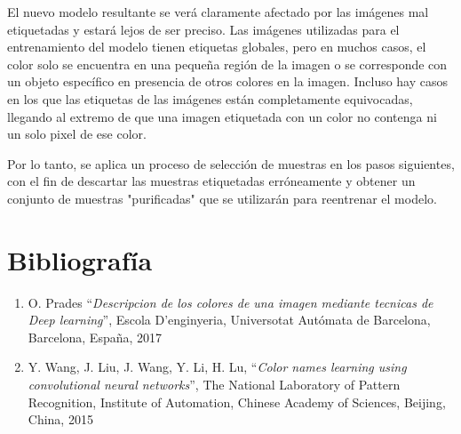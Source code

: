\documentclass[14pt,a4paper]{report}
\begin{document}
El nuevo modelo resultante se verá claramente afectado por las imágenes mal etiquetadas y estará lejos de ser preciso. Las imágenes utilizadas para el entrenamiento del modelo tienen etiquetas globales, pero en muchos casos, el color solo se encuentra en una pequeña región de la imagen o se corresponde con un objeto específico en presencia de otros colores en la imagen. Incluso hay casos en los que las etiquetas de las imágenes están completamente equivocadas, llegando al extremo de que una imagen etiquetada con un color no contenga ni un solo pixel de ese color.

Por lo tanto, se aplica un proceso de selección de muestras en los pasos siguientes, con el fin de descartar las muestras etiquetadas erróneamente y obtener un conjunto de muestras "purificadas" que se utilizarán para reentrenar el modelo.

\newpage
\section*{Bibliografía}
\begin{enumerate}
\item O. Prades “\textit{Descripcion de los colores de una imagen mediante tecnicas de Deep learning}”, Escola D’enginyeria, Universotat Autómata de Barcelona, Barcelona, España, 2017

\item Y. Wang, J. Liu, J. Wang, Y. Li, H. Lu, “\textit{Color names learning using convolutional neural networks}”, The National Laboratory of Pattern Recognition, Institute of Automation, Chinese Academy of Sciences, Beijing, China, 2015
\end{enumerate}
\end{document}
